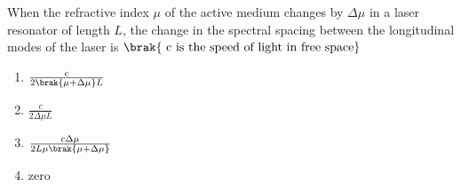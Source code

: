 \iffalse
	\title{2008-PH-52-68}
	\author{EE24Btech11006 - Arnav Mahishi}
	\section{ph}
	\chapter{2008}
\fi
\item{
When the refractive index $\mu$ of the active medium changes by $\Delta\mu$ in a laser resonator of length $L$, the change in the spectral spacing between the longitudinal modes of the laser is $\brak{\text{ c is the speed of light in free space}}$ 
\begin{multicols}{2}
\begin{enumerate}
\item$\frac{c}{2\brak{\mu+\Delta\mu}L}$
\item$\frac{c}{2\Delta\mu L}$
\item$\frac{c\Delta\mu}{2L\mu\brak{\mu+\Delta\mu}}$
\item zero
\end{enumerate}
\end{multicols}
}
